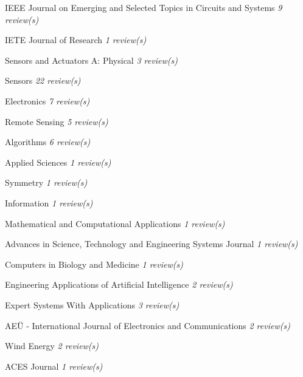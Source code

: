 {\begin{cvitems}
        \item {IEEE Journal on Emerging and Selected Topics in Circuits and Systems \hfill \bodyfontlight\slshape\color{awesome} 9 review(s)}
        \item {IETE Journal of Research \hfill \bodyfontlight\slshape\color{awesome} 1 review(s)}
        \item {Sensors and Actuators A: Physical \hfill \bodyfontlight\slshape\color{awesome} 3 review(s)}
        \item {Sensors \hfill \bodyfontlight\slshape\color{awesome} 22 review(s)}
        \item {Electronics \hfill \bodyfontlight\slshape\color{awesome} 7 review(s)}
        \item {Remote Sensing \hfill \bodyfontlight\slshape\color{awesome} 5 review(s)}
        \item {Algorithms \hfill \bodyfontlight\slshape\color{awesome} 6 review(s)}
        \item {Applied Sciences \hfill \bodyfontlight\slshape\color{awesome} 1 review(s)}
        \item {Symmetry \hfill \bodyfontlight\slshape\color{awesome} 1 review(s)}
        \item {Information \hfill \bodyfontlight\slshape\color{awesome} 1 review(s)}
        \item {Mathematical and Computational Applications \hfill \bodyfontlight\slshape\color{awesome} 1 review(s)}
        \item {Advances in Science, Technology and Engineering Systems Journal \hfill \bodyfontlight\slshape\color{awesome} 1 review(s)}
        \item {Computers in Biology and Medicine \hfill \bodyfontlight\slshape\color{awesome} 1 review(s)}
        \item {Engineering Applications of Artificial Intelligence \hfill \bodyfontlight\slshape\color{awesome} 2 review(s)}
        \item {Expert Systems With Applications \hfill \bodyfontlight\slshape\color{awesome} 3 review(s)}
        \item {AEÜ - International Journal of Electronics and Communications \hfill \bodyfontlight\slshape\color{awesome} 2 review(s)}
        \item {Wind Energy \hfill \bodyfontlight\slshape\color{awesome} 2 review(s)}
        \item {ACES Journal \hfill \bodyfontlight\slshape\color{awesome} 1 review(s)}
        
        \vspace{4.0mm}
    \end{cvitems}
}

